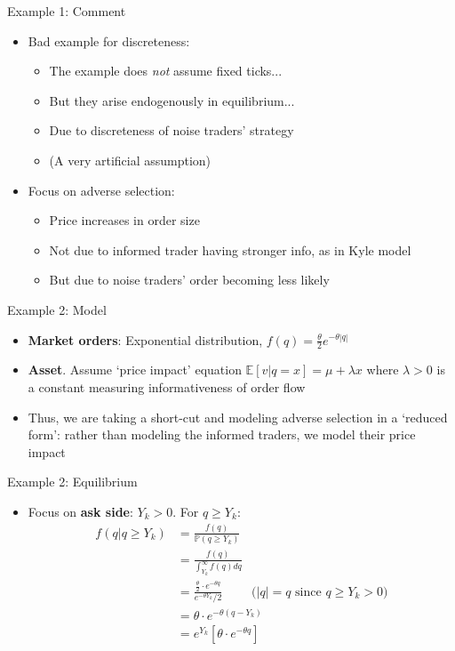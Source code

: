 \documentclass[english,10pt]{beamer}
\begin{document}
\begin{frame}{Example 1: Comment}
	\begin{itemize}
		\item Bad example for discreteness:
		\begin{itemize}
			\item The example does \emph{not} assume fixed ticks...
			\item But they arise endogenously in equilibrium...
			\item Due to discreteness of noise traders' strategy
			\item (A very artificial assumption)
		\end{itemize}
		\item Focus on adverse selection:
		\begin{itemize}
			\item Price increases in order size
			\item Not due to informed trader having stronger info, as in Kyle model
			\item But due to noise traders' order becoming less likely
		\end{itemize}
	\end{itemize}
\end{frame}


\begin{frame}{Example 2: Model}
	\begin{itemize}
		\item \textbf{Market orders}: Exponential distribution, $f(q)=\frac{\theta}{2} e^{-\theta|q|}$
		\item \textbf{Asset}. Assume `price impact' equation $\mathbb{E}[v|q=x] = \mu + \lambda x$ where $\lambda >0$ is a constant measuring informativeness of order flow
		\item Thus, we are taking a short-cut and modeling adverse selection in a `reduced form': rather than modeling the informed traders, we model their price impact
	\end{itemize}
\end{frame}


\begin{frame}{Example 2: Equilibrium}
	\begin{itemize}
		\item Focus on  \textbf{ask side}: $Y_k>0$. For $q \geq Y_{k}$:
		\begin{align*}
		f(q|q \ge Y_k)&=\frac{f(q)}{ \mathbb{P}(q \geq Y_{k})} \\
		&= \frac{f(q)}{\int^\infty_{Y_k} f(q) dq}\\
		&= \frac{\frac{\theta}{2} \cdot e^{-\theta q}}{e^{-\theta Y_{k}}/2} \quad \quad \text{ ($|q|=q$ since $q \ge Y_k>0$)}\\
		& =\theta \cdot e^{-\theta(q-Y_{k})}\\
		& = e^{Y_k} \left[ \theta \cdot e^{-\theta q} \right]
		\end{align*}
	\end{itemize}
\end{frame}
\end{document}
